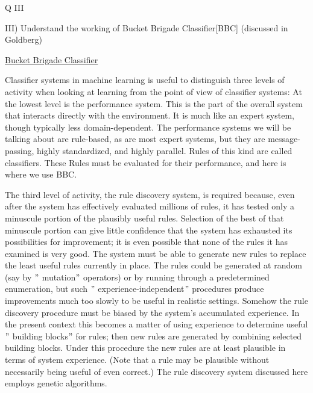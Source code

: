 \documentclass[12pt]{article}
\renewcommand{\_}{\kern-1.5pt\textunderscore\kern-1.5pt}
\begin{document}
\vspace{\baselineskip}

\vspace{\baselineskip}

\vspace{\baselineskip}
\begin{Center}
{\fontsize{28pt}{33.6pt}\selectfont Q III\par}
\end{Center}\par

{\fontsize{14pt}{16.8pt}\selectfont III) Understand the working of Bucket Brigade Classifier[BBC] (discussed in Goldberg)\par}\par

{\fontsize{14pt}{16.8pt}\selectfont \uline{Bucket Brigade Classifier}\par}\par

Classifier systems in machine learning is useful to distinguish three levels of activity when looking at learning from the point of view of classifier systems: At the lowest level is the performance system. This is the part of the overall system that interacts directly with the environment. It is much like an expert system, though typically less domain-dependent. The performance systems we will be talking about are rule-based, as are most expert systems, but they are message-passing, highly standardized, and highly parallel. Rules of this kind are called classifiers. These Rules must be evaluated for their performance, and here is where we use BBC.\par

The third level of activity, the rule discovery system, is required because, even after the system has effectively evaluated millions of rules, it has tested only a minuscule portion of the plausibly useful rules. Selection of the best of that minuscule portion can give little confidence that the system has exhausted its possibilities for improvement; it is even possible that none of the rules it has examined is very good. The system must be able to generate new rules to replace the least useful rules currently in place. The rules could be generated at random (say by $"$ mutation$"$  operators) or by running through a predetermined enumeration, but such $"$ experience-independent$"$  procedures produce improvements much too slowly to be useful in realistic settings. Somehow the rule discovery procedure must be biased by the system’s accumulated experience. In the present context this becomes a matter of using experience to determine useful $"$ building blocks$"$  for rules; then new rules are generated by combining selected building blocks. Under this procedure the new rules are at least plausible in terms of system experience. (Note that a rule may be plausible without necessarily being useful of even correct.) The rule discovery system discussed here employs genetic algorithms.\par
\end{document}
